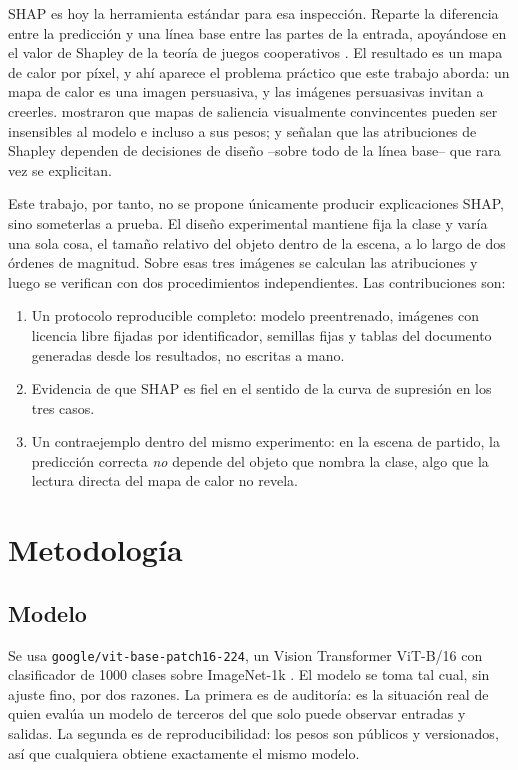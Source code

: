 \documentclass[11pt]{article}
\begin{document}
SHAP \citep{lundberg2017unified} es hoy la herramienta estándar para esa inspección.
Reparte la diferencia entre la predicción y una línea base entre las partes de la
entrada, apoyándose en el valor de Shapley de la teoría de juegos cooperativos
\citep{shapley1953value}. El resultado es un mapa de calor por píxel, y ahí aparece el
problema práctico que este trabajo aborda: un mapa de calor es una imagen persuasiva,
y las imágenes persuasivas invitan a creerles. \citet{adebayo2018sanity} mostraron que
mapas de saliencia visualmente convincentes pueden ser insensibles al modelo e incluso
a sus pesos; \citet{kumar2020problems} y \citet{sundararajan2020many} señalan que las
atribuciones de Shapley dependen de decisiones de diseño --sobre todo de la línea
base-- que rara vez se explicitan.

Este trabajo, por tanto, no se propone únicamente producir explicaciones SHAP, sino
someterlas a prueba. El diseño experimental mantiene fija la clase y varía una sola
cosa, el tamaño relativo del objeto dentro de la escena, a lo largo de dos órdenes de
magnitud. Sobre esas tres imágenes se calculan las atribuciones y luego se verifican
con dos procedimientos independientes. Las contribuciones son:

\begin{enumerate}
  \item Un protocolo reproducible completo: modelo preentrenado, imágenes con licencia
        libre fijadas por identificador, semillas fijas y tablas del documento
        generadas desde los resultados, no escritas a mano.
  \item Evidencia de que SHAP es fiel en el sentido de la curva de supresión en los
        tres casos.
  \item Un contraejemplo dentro del mismo experimento: en la escena de partido, la
        predicción correcta \emph{no} depende del objeto que nombra la clase, algo que
        la lectura directa del mapa de calor no revela.
\end{enumerate}

\section{Metodología}

\subsection{Modelo}

Se usa \texttt{google/vit-base-patch16-224}, un Vision Transformer ViT-B/16
\citep{dosovitskiy2021image} con clasificador de 1000 clases sobre ImageNet-1k
\citep{deng2009imagenet}. El modelo se toma tal cual, sin ajuste fino, por dos
razones. La primera es de auditoría: es la situación real de quien evalúa un modelo
de terceros del que solo puede observar entradas y salidas. La segunda es de
reproducibilidad: los pesos son públicos y versionados, así que cualquiera obtiene
exactamente el mismo modelo.
\end{document}
